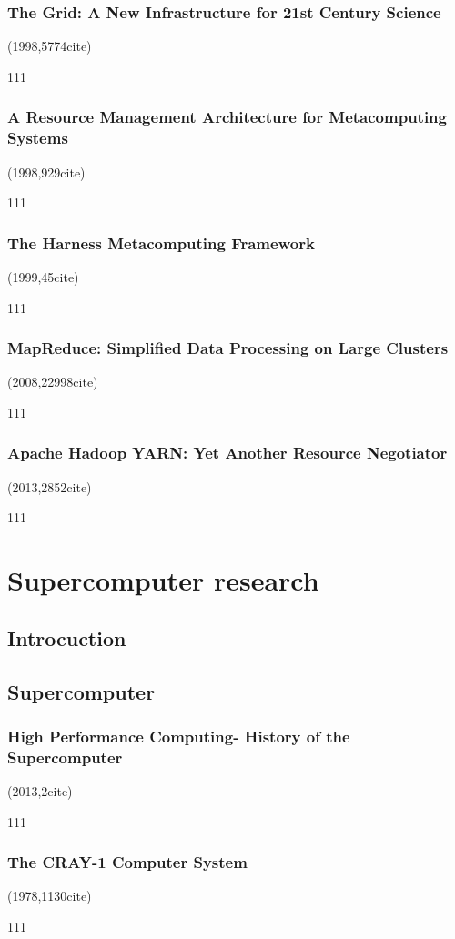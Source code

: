 \documentclass[a4paper,twoside]{scrbook}
\begin{document}
\subsection{The Grid: A New Infrastructure for 21st Century Science \cite{foster2002grid}}
(1998,5774cite)\par
111
\subsection{A Resource Management Architecture for Metacomputing Systems \cite{czajkowski1998resource}}
(1998,929cite)\par
111
\subsection{The Harness Metacomputing Framework
\cite{migliardi1999harness}}
(1999,45cite)\par
111
\subsection{MapReduce: Simplified Data Processing on Large Clusters \cite{dean2008mapreduce}}
(2008,22998cite)\par
111
\subsection{Apache Hadoop YARN: Yet Another Resource Negotiator \cite{vavilapalli2013apache}}
(2013,2852cite)\par
111
\chapter{Supercomputer research}
\section{Introcuction}
\section{Supercomputer}
\subsection{High Performance Computing- History of the Supercomputer\cite{probert2013high}}
(2013,2cite)\par
111
\subsection{The CRAY-1 Computer System\cite{russell1978cray}}
(1978,1130cite)\par
111
\end{document}

